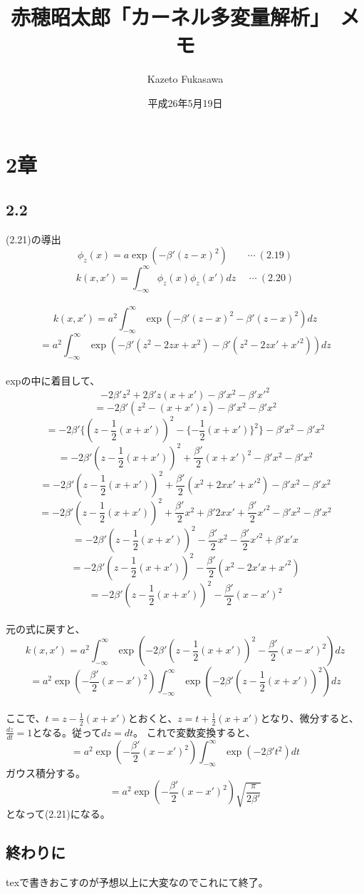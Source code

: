 \documentclass{jarticle}
\title{赤穂昭太郎「カーネル多変量解析」　メモ}
\author{Kazeto Fukasawa}
\date{平成26年5月19日}
\begin{document}
\maketitle
\section{2章}
\subsection*{2.2}
(2.21)の導出\\
\[
\phi_{z}(x) = a \exp(-\beta'(z-x)^2) \ \ \ \ \ \ \ \ \ \cdots \ (2.19)
\]
\[
k(x,x') = \int_{-\infty}^{\infty} \phi_{z}(x) \phi_{z}(x') dz \ \ \ \ \ \  \cdots \ (2.20)
\]
\\
\[
k(x,x') = a^2 \int_{-\infty}^{\infty} \exp(-\beta' (z-x)^2 - \beta' (z-x)^2) dz
\]
\[
= a^2 \int_{-\infty}^{\infty} \exp(-\beta' (z^2-2zx+x^2) - \beta' (z^2-2zx'+x'^2) ) dz
\]
\\
expの中に着目して、\\
\[
-2\beta'z^2 + 2\beta'z(x+x') -\beta'x^2 - \beta'x'^2
\]
\[
= -2\beta'(z^2 - (x+x')z) - \beta'x^2 - \beta'x^2
\]
\[
= -2\beta' \{(z - \frac{1}{2} (x+x'))^2 - \{- \frac{1}{2}(x+x') \}^2 \}  - \beta'x^2 - \beta'x^2
\]
\[
= -2\beta' (z-\frac{1}{2} (x+x'))^2 + \frac{\beta'}{2}(x+x')^2   - \beta'x^2 - \beta'x^2
\]
 \[
 = -2\beta' (z-\frac{1}{2} (x+x'))^2 + \frac{\beta'}{2}(x^2 + 2xx' + x'^2) - \beta'x^2 - \beta'x^2
 \]
 \[
  = -2\beta' (z-\frac{1}{2} (x+x'))^2 + \frac{\beta'}{2}x^2 +\beta' 2xx' +\frac{\beta'}{2}x'^2 - \beta'x^2 - \beta'x^2
 \]
 \[
   = -2\beta' (z-\frac{1}{2} (x+x'))^2  - \frac{\beta'}{2}x^2 - \frac{\beta'}{2}x'^2 + \beta' x' x
 \]
 \[
    = -2\beta' (z-\frac{1}{2} (x+x'))^2 - \frac{\beta'}{2}(x^2 - 2x'x + x'^2)
 \]
 \[
  = -2\beta' (z-\frac{1}{2} (x+x'))^2 - \frac{\beta'}{2}(x-x')^2
  \]
\\  
元の式に戻すと、
\[
k(x,x') = a^2 \int_{-\infty}^{\infty} \exp(-2\beta' (z-\frac{1}{2} (x+x'))^2 - \frac{\beta'}{2}(x-x')^2) dz
\]
\[
= a^2 \exp(- \frac{\beta'}{2}(x-x')^2)  \int_{-\infty}^{\infty} \exp(-2\beta' (z-\frac{1}{2} (x+x'))^2 ) dz
\]
\\
ここで、$t=z-\frac{1}{2}(x+x')$とおくと、$z=t+\frac{1}{2}(x+x')$となり、微分すると、$\frac{dz}{dt} =1$となる。従って$dz=dt$。
これで変数変換すると、
\[
 =  a^2 \exp(- \frac{\beta'}{2}(x-x')^2)  \int_{-\infty}^{\infty} \exp(-2\beta' t^2) dt
\]
ガウス積分する。
\[
= a^2 \exp(- \frac{\beta'}{2}(x-x')^2) \sqrt{\frac{\pi}{2\beta'}}
\]
となって(2.21)になる。
\subsection*{終わりに}
texで書きおこすのが予想以上に大変なのでこれにて終了。
\end{document}
